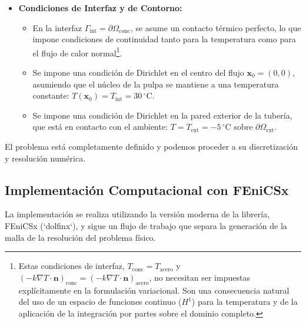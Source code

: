 \begin{itemize}
    \item \textbf{Condiciones de Interfaz y de Contorno:}
    \begin{itemize}
        \item En la interfaz \(\Gamma_{\text{int}} = \partial\Omega_{\text{conc}}\), se asume un contacto térmico perfecto, lo que impone condiciones de continuidad tanto para la temperatura como para el flujo de calor normal\footnote{Estas condiciones de interfaz, \(T_{\text{conc}} = T_{\text{acero}}\) y \(\left(-k \nabla T \cdot \bm{n}\right)_{\text{conc}} = \left(-k \nabla T \cdot \bm{n}\right)_{\text{acero}}\), no necesitan ser impuestas explícitamente en la formulación variacional. Son una consecuencia natural del uso de un espacio de funciones continuo (\(H^1\)) para la temperatura y de la aplicación de la integración por partes sobre el dominio completo.}.
        \item Se impone una condición de Dirichlet en el centro del flujo \(\bm{x}_0=(0,0)\), asumiendo que el núcleo de la pulpa se mantiene a una temperatura constante: \(T(\bm{x}_0) = T_{\text{int}} = 30 \, ^\circ\text{C}\).
        \item Se impone una condición de Dirichlet en la pared exterior de la tubería, que está en contacto con el ambiente: \(T = T_{\text{ext}} = -5 \, ^\circ\text{C}\) sobre \(\partial\Omega_{\text{ext}}\).
    \end{itemize}
\end{itemize}
El problema está completamente definido y podemos proceder a su discretización y resolución numérica.

\subsection{Implementación Computacional con FEniCSx}
La implementación se realiza utilizando la versión moderna de la librería, FEniCSx (`dolfinx`), y sigue un flujo de trabajo que separa la generación de la malla de la resolución del problema físico.

